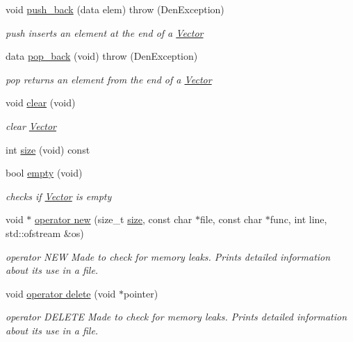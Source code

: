 \begin{DoxyCompactItemize}
void \hyperlink{classVector_a8e34f2f9943752507540bc80dba453fd}{push\+\_\+back} (data elem)  throw (\+Den\+Exception)
\begin{DoxyCompactList}\small\item\em push  inserts an element at the end of a \hyperlink{classVector}{Vector} \end{DoxyCompactList}\item 
data \hyperlink{classVector_af58fb997ed40663eb1e9f17b96cbc846}{pop\+\_\+back} (void)  throw (\+Den\+Exception)
\begin{DoxyCompactList}\small\item\em pop  returns an element from the end of a \hyperlink{classVector}{Vector} \end{DoxyCompactList}\item 
\mbox{\label{classVector_a9a4aa65c1485541c654f3917cc4d37e9}} 
void \hyperlink{classVector_a9a4aa65c1485541c654f3917cc4d37e9}{clear} (void)
\begin{DoxyCompactList}\small\item\em clear \hyperlink{classVector}{Vector} \end{DoxyCompactList}\item 
int \hyperlink{classVector_a81b1d973485244101caf8e901b4a03d9}{size} (void) const
\item 
bool \hyperlink{classVector_ae203aae4d9a6dbabd4883c9e6fd84f79}{empty} (void)
\begin{DoxyCompactList}\small\item\em checks if \hyperlink{classVector}{Vector} is empty \end{DoxyCompactList}\item 
void $\ast$ \hyperlink{classVector_a9c18dedab606f55fd10516de05efe05e}{operator new} (size\+\_\+t \hyperlink{classVector_a81b1d973485244101caf8e901b4a03d9}{size}, const char $\ast$file, const char $\ast$func, int line, std\+::ofstream \&os)
\begin{DoxyCompactList}\small\item\em operator N\+EW  Made to check for memory leaks. Prints detailed information about its use in a file. \end{DoxyCompactList}\item 
void \hyperlink{classVector_a7994afefee442d3980f1b1125152fe50}{operator delete} (void $\ast$pointer)
\begin{DoxyCompactList}\small\item\em operator D\+E\+L\+E\+TE  Made to check for memory leaks. Prints detailed information about its use in a file. \end{DoxyCompactList}\end{DoxyCompactItemize}
